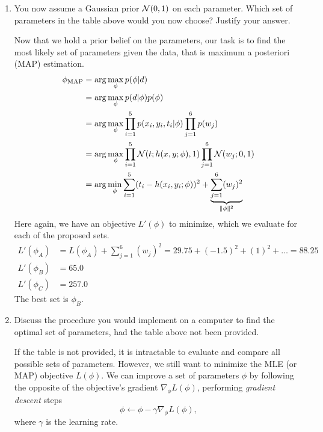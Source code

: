 \documentclass[11pt, a4paper]{article}
\begin{document}
\begin{enumerate}
    \item You now assume a Gaussian prior $\mathcal{N}(0, 1)$ on each parameter. Which set of parameters in the table above would you now choose? Justify your answer.

    \begin{solution}
        Now that we hold a prior belief on the parameters, our task is to find the most likely set of parameters given the data, that is maximum a posteriori (MAP) estimation.
        \begin{align*}
            \phi_{\text{MAP}} & = \arg\max_\phi p(\phi | d) \\
            & = \arg\max_\phi p(d | \phi) p(\phi) \\
            & = \arg\max_\phi \prod_{i=1}^5 p(x_i, y_i, t_i | \phi) \prod_{j=1}^6 p(w_j) \\
            & = \arg\max_\phi \prod_{i=1}^5 \mathcal{N}(t; h(x, y; \phi), 1) \prod_{j=1}^6 \mathcal{N}(w_j; 0, 1) \\
            & = \arg\min_\phi \sum_{i=1}^5 (t_i - h(x_i, y_i; \phi))^2 + \underbrace{\sum_{j=1}^6 (w_j)^2}_{\lVert\phi\rVert^2}
        \end{align*}
        Here again, we have an objective $L'(\phi)$ to minimize, which we evaluate for each of the proposed sets.
        \begin{align*}
            L'(\phi_A) & = L(\phi_A) + \sum_{j=1}^6 (w_j)^2 = 29.75 + (-1.5)^2 + (1)^2 + \dots = 88.25 \\
            L'(\phi_B) & = 65.0 \\
            L'(\phi_C) & = 257.0
        \end{align*}
        The best set is $\phi_B$.
    \end{solution}

    \item Discuss the procedure you would implement on a computer to find the optimal set of parameters, had the table above not been provided.

    \begin{solution}
        If the table is not provided, it is intractable to evaluate and compare all possible sets of parameters. However, we still want to minimize the MLE (or MAP) objective $L(\phi)$. We can improve a set of parameters $\phi$ by following the opposite of the objective's gradient $\nabla_{\! \phi} L(\phi)$, \ie{} performing \emph{gradient descent} steps
        \begin{equation*}
            \phi \gets \phi - \gamma \nabla_{\! \phi} L(\phi) ,
        \end{equation*}
        where $\gamma$ is the learning rate.
    \end{solution}
\end{enumerate}
\end{document}
